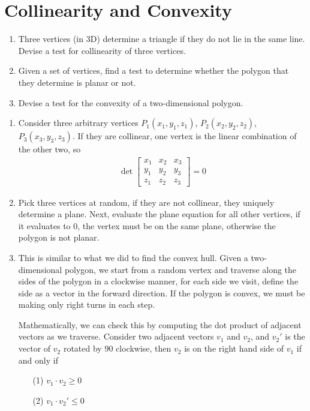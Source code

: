 \documentclass[11pt]{article}  %
\begin{document}
\section{Collinearity and Convexity}
    \begin{enumerate}[leftmargin=*]
        \item Three vertices (in 3D) determine a triangle if they do not lie in the same line. Devise a test for collinearity of three vertices.
        \item Given a set of vertices, find a test to determine whether the polygon that they determine is planar or not.
        \item Devise a test for the convexity of a two-dimensional polygon.
    \end{enumerate}

\solution
    \begin{enumerate}[leftmargin=*, topsep=0pt]
        \item Consider three arbitrary vertices $P_1(x_1,y_1,z_1)$, $P_2(x_2,y_2,z_2)$, $P_3(x_3,y_3,z_3)$. If they are collinear, one vertex is the linear combination of the other two, so
        \begin{align*}
            \det{\begin{bmatrix}
                x_1 & x_2 & x_3\\
                y_1 & y_2 & y_3\\
                z_1 & z_2 & z_3
            \end{bmatrix}} = 0
        \end{align*}
        
        \item Pick three vertices at random, if they are not collinear, they uniquely determine a plane. Next, evaluate the plane equation for all other vertices, if it evaluates to 0, the vertex must be on the same plane, otherwise the polygon is not planar.
        
        \item This is similar to what we did to find the convex hull. Given a two-dimensional polygon, we start from a random vertex and traverse along the sides of the polygon in a clockwise manner, for each side we visit, define the side as a vector in the forward direction. If the polygon is convex, we must be making only right turns in each step.

        Mathematically, we can check this by computing the dot product of adjacent vectors as we traverse. Consider two adjacent vectors $v_1$ and $v_2$, and $v_2'$ is the vector of $v_2$ rotated by 90\textdegree\hspace{0mm} clockwise, then $v_2$ is on the right hand side of $v_1$ if and only if
        \begin{enumerate}[itemsep=0mm]
            \item[(1)] $v_1 \cdot v_2 \geq 0$
            \item[(2)] $v_1 \cdot v_2' \leq 0$
        \end{enumerate}
    \end{enumerate}
\end{document}
